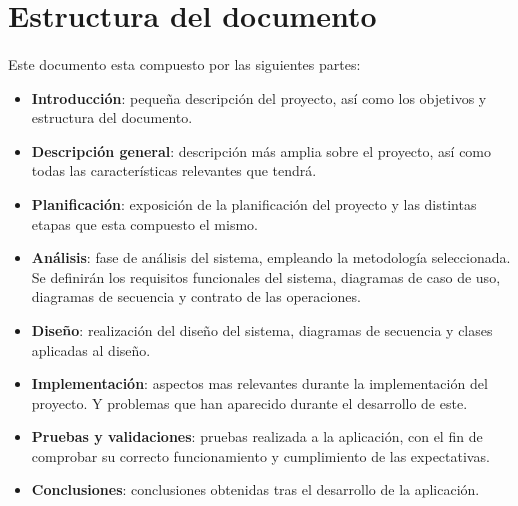\section{Estructura del documento}

\paragraph{}
Este documento esta compuesto por las siguientes partes:

\begin{itemize}
    \item \textbf{Introducción}: pequeña descripción del proyecto, así como los objetivos y estructura del documento.
    
    \item \textbf{Descripción general}: descripción más amplia sobre el proyecto, así como todas las características relevantes
    que tendrá.
    
    \item \textbf{Planificación}: exposición de la planificación del proyecto y las distintas etapas que esta compuesto el mismo.
    
    \item \textbf{Análisis}: fase de análisis del sistema, empleando la metodología seleccionada. Se definirán los
    requisitos funcionales del sistema, diagramas de caso de uso, diagramas de secuencia y contrato de las operaciones.

    \item \textbf{Diseño}: realización del diseño del sistema, diagramas de secuencia y clases aplicadas al diseño.
    
    \item \textbf{Implementación}: aspectos mas relevantes durante la implementación del proyecto. Y problemas que han aparecido 
    durante el desarrollo de este.
    
    \item \textbf{Pruebas y validaciones}: pruebas realizada a la aplicación, con el fin de comprobar su correcto funcionamiento y
    cumplimiento de las expectativas.
    
    \item \textbf{Conclusiones}: conclusiones obtenidas tras el desarrollo de la aplicación.
    

\end{itemize}
